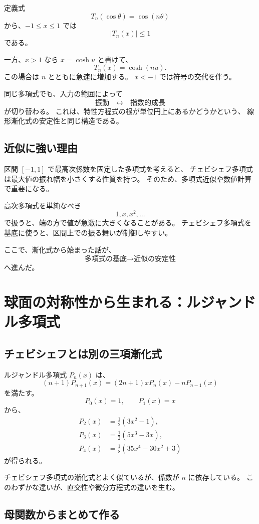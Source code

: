 定義式
\[
  T_n(\cos\theta)=\cos(n\theta)
\]
から、$-1\le x\le1$ では
\[
  |T_n(x)|\le1
\]
である。

一方、$x>1$ なら $x=\cosh u$ と書けて、
\[
  T_n(x)=\cosh(nu).
\]
この場合は $n$ とともに急速に増加する。
$x<-1$ では符号の交代を伴う。

同じ多項式でも、入力の範囲によって
\[
  \text{振動}\quad\longleftrightarrow\quad\text{指数的成長}
\]
が切り替わる。
これは、特性方程式の根が単位円上にあるかどうかという、
線形漸化式の安定性と同じ構造である。

\subsection{近似に強い理由}

区間 $[-1,1]$ で最高次係数を固定した多項式を考えると、
チェビシェフ多項式は最大値の振れ幅を小さくする性質を持つ。
そのため、多項式近似や数値計算で重要になる。

高次多項式を単純なべき
\[
  1,x,x^2,\ldots
\]
で扱うと、端の方で値が急激に大きくなることがある。
チェビシェフ多項式を基底に使うと、区間上での振る舞いが制御しやすい。

ここで、漸化式から始まった話が、
\[
  \text{多項式の基底}
  \longrightarrow
  \text{近似の安定性}
\]
へ進んだ。

\section{球面の対称性から生まれる：ルジャンドル多項式}

\subsection{チェビシェフとは別の三項漸化式}

ルジャンドル多項式 $P_n(x)$ は、
\[
  (n+1)P_{n+1}(x)
  =(2n+1)xP_n(x)-nP_{n-1}(x)
\]
を満たす。
\[
  P_0(x)=1,\qquad P_1(x)=x
\]
から、
\[
\begin{aligned}
  P_2(x)&=\frac12(3x^2-1),\\
  P_3(x)&=\frac12(5x^3-3x),\\
  P_4(x)&=\frac18(35x^4-30x^2+3)
\end{aligned}
\]
が得られる。

チェビシェフ多項式の漸化式とよく似ているが、係数が $n$ に依存している。
このわずかな違いが、直交性や微分方程式の違いを生む。

\subsection{母関数からまとめて作る}

